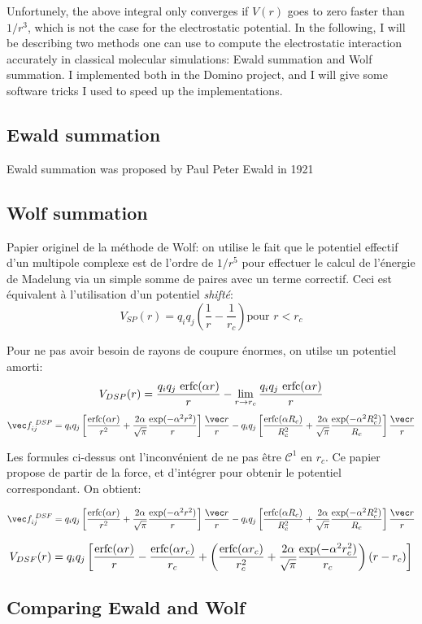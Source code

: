 \documentclass[thesis]{subfiles}
\begin{document}
Unfortunely, the above integral only converges if $V(r)$ goes to zero faster
than $1/r^3$, which is not the case for the electrostatic potential. In the
following, I will be describing two methods one can use to compute the
electrostatic interaction accurately in classical molecular simulations: Ewald
summation and Wolf summation. I implemented both in the Domino project, and I
will give some software tricks I used to speed up the implementations.

\subsection{Ewald summation}

Ewald summation was proposed by Paul Peter Ewald in 1921\cite{Ewald1921}

\subsection{Wolf summation}

Papier originel de la méthode de Wolf\cite{Wolf1999}: on utilise le fait que le
potentiel effectif d'un multipole complexe est de l'ordre de $1/r^5$ pour
effectuer le calcul de l'énergie de Madelung via un simple somme de paires avec
un terme correctif. Ceci est équivalent à l'utilisation d'un potentiel
\emph{shifté}:
\[V_{SP}(r) = q_i q_j \left(\frac{1}{r} - \frac{1}{r_c} \right) \text{pour } r < r_c\]

Pour ne pas avoir besoin de rayons de coupure énormes, on utilse un potentiel amorti:
\[V_{DSP}(r) = \frac{q_i q_j \ \erfc(\alpha r)}{r} - \lim_{r \to r_c} \frac{q_i q_j \ \erfc(\alpha r)}{r}\]
\[\vec f_{ij}^{\ DSP} = q_i q_j \left[\frac{\erfc(\alpha r)}{r^2} + \frac{2\alpha}{\sqrt{\pi}} \frac{\exp(-\alpha^2 r^2)}{r}\right] \frac{\vec r}{r}
- q_i q_j \left[\frac{\erfc(\alpha R_c)}{R_c^2} + \frac{2\alpha}{\sqrt{\pi}} \frac{\exp(-\alpha^2 R_c^2)}{R_c}\right] \frac{\vec r}{r}\]


Les formules ci-dessus ont l'inconvénient de ne pas être $\mathcal{C}^1$ en $r_c$. Ce
papier\cite{Fennell2006} propose de partir de la force, et d'intégrer pour obtenir le potentiel
correspondant. On obtient:

\[\vec f_{ij}^{\ DSF} = q_i q_j \left[\frac{\erfc(\alpha r)}{r^2} + \frac{2\alpha}{\sqrt{\pi}} \frac{\exp(-\alpha^2 r^2)}{r}\right] \frac{\vec r}{r}
- q_i q_j \left[\frac{\erfc(\alpha R_c)}{R_c^2} + \frac{2\alpha}{\sqrt{\pi}} \frac{\exp(-\alpha^2 R_c^2)}{R_c}\right] \frac{\vec r}{r}\]

\[V_{DSF}(r) = q_i q_j \left[\frac{\text{erfc}(\alpha r)}{r} - \frac{\text{erfc}(\alpha r_c)}{r_c}
+ \left(\frac{\text{erfc}(\alpha r_c)}{r_c^2} + \frac{2\alpha}{\sqrt{\pi}} \frac{\exp(-\alpha^2 r_c^2)}{r_c}\right) (r - r_c)\right]\]


\TODO \cite{Fukuda2013}

\subsection{Comparing Ewald and Wolf}

\OnlyInSubfile{\printbibliography}
\end{document}
